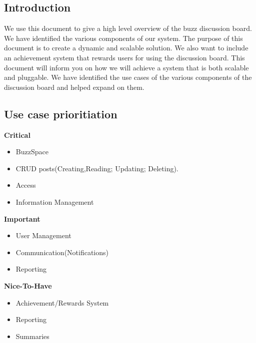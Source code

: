 \documentclass[a4paper,12pt]{report}
\begin{document}
\subsection{Introduction}
We use this document to give a high level overview of the buzz  discussion board. We have identified the various components of our system. The purpose of this document is to create a dynamic and scalable solution. We also want to include an achievement system that rewards users for using the discussion board. This document will inform you on how we will achieve a system that is both scalable and pluggable. We have identified the use cases of the various components of the discussion board and helped expand on them.
\newpage
\subsection{Use case prioritiation}
\textbf{Critical} 
\begin{itemize}
  \item BuzzSpace
  \item CRUD posts(Creating,Reading; Updating; Deleting).
  \item Access
  \item Information Management
  \end{itemize}
\textbf{Important} 
\begin{itemize}
  \item User Management
  \item Communication(Notifications)
  \item Reporting
\end{itemize}
\textbf{Nice-To-Have} 
\begin{itemize}
  \item Achievement/Rewards System
  \item Reporting
  \item Summaries
\end{itemize}
\end{document}
